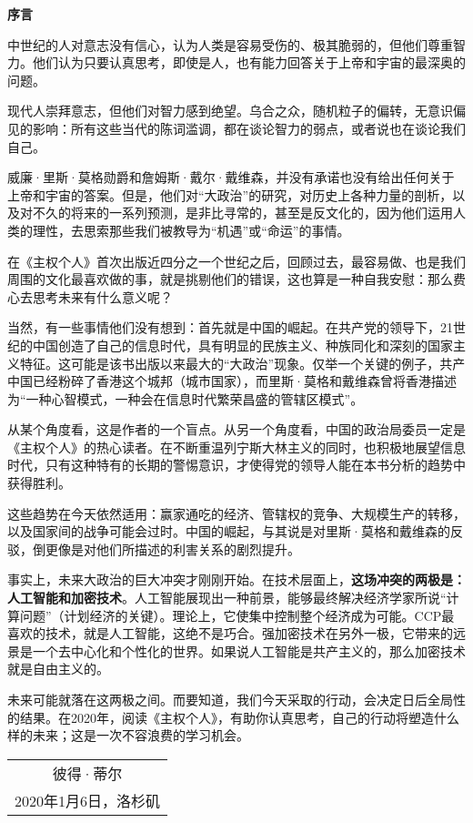 \begin{center}
    \Huge\textbf{序言}
\end{center}

中世纪的人对意志没有信心，认为人类是容易受伤的、极其脆弱的，但他们尊重智力。他们认为只要认真思考，即使是人，也有能力回答关于上帝和宇宙的最深奥的问题。

现代人崇拜意志，但他们对智力感到绝望。乌合之众，随机粒子的偏转，无意识偏见的影响：所有这些当代的陈词滥调，都在谈论智力的弱点，或者说也在谈论我们自己。

威廉·里斯·莫格勋爵和詹姆斯·戴尔·戴维森，并没有承诺也没有给出任何关于上帝和宇宙的答案。但是，他们对“大政治”的研究，对历史上各种力量的剖析，以及对不久的将来的一系列预测，是非比寻常的，甚至是反文化的，因为他们运用人类的理性，去思索那些我们被教导为“机遇”或“命运”的事情。

在《主权个人》首次出版近四分之一个世纪之后，回顾过去，最容易做、也是我们周围的文化最喜欢做的事，就是挑剔他们的错误，这也算是一种自我安慰：那么费心去思考未来有什么意义呢？

当然，有一些事情他们没有想到：首先就是中国的崛起。在共产党的领导下，21世纪的中国创造了自己的信息时代，具有明显的民族主义、种族同化和深刻的国家主义特征。这可能是该书出版以来最大的“大政治”现象。仅举一个关键的例子，共产中国已经粉碎了香港这个城邦（城市国家），而里斯·莫格和戴维森曾将香港描述为“一种心智模式，一种会在信息时代繁荣昌盛的管辖区模式”。

从某个角度看，这是作者的一个盲点。从另一个角度看，中国的政治局委员一定是《主权个人》的热心读者。在不断重温列宁斯大林主义的同时，也积极地展望信息时代，只有这种特有的长期的警惕意识，才使得党的领导人能在本书分析的趋势中获得胜利。

这些趋势在今天依然适用：赢家通吃的经济、管辖权的竞争、大规模生产的转移，以及国家间的战争可能会过时。中国的崛起，与其说是对里斯·莫格和戴维森的反驳，倒更像是对他们所描述的利害关系的剧烈提升。

事实上，未来大政治的巨大冲突才刚刚开始。在技术层面上，\textbf{这场冲突的两极是：人工智能和加密技术}。人工智能展现出一种前景，能够最终解决经济学家所说“计算问题”（计划经济的关键）。理论上，它使集中控制整个经济成为可能。CCP最喜欢的技术，就是人工智能，这绝不是巧合。强加密技术在另外一极，它带来的远景是一个去中心化和个性化的世界。如果说人工智能是共产主义的，那么加密技术就是自由主义的。

未来可能就落在这两极之间。而要知道，我们今天采取的行动，会决定日后全局性的结果。在2020年，阅读《主权个人》，有助你认真思考，自己的行动将塑造什么样的未来；这是一次不容浪费的学习机会。

\vspace{2em}

\begin{flushright}
    \begin{tabular}{c}
        彼得·蒂尔\\
        2020年1月6日，洛杉矶
    \end{tabular}
\end{flushright}



